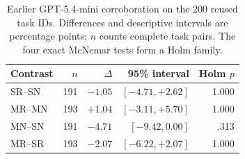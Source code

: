 \begin{table}[t]
\caption{Earlier GPT-5.4-mini corroboration on the 200 reused task IDs. Differences and descriptive intervals are percentage points; $n$ counts complete task pairs. The four exact McNemar tests form a Holm family.}
\label{tab:mini-validation}
\centering\small
\begin{tabular}{@{}lrrrr@{}}
\toprule
Contrast & $n$ & $\Delta$ & 95\% interval & Holm $p$\\
\midrule
SR--SN & 191 & $-1.05$ & $[-4.71,+2.62]$ & 1.000\\
MR--MN & 193 & $+1.04$ & $[-3.11,+5.70]$ & 1.000\\
MN--SN & 191 & $-4.71$ & $[-9.42,0.00]$ & .313\\
MR--SR & 193 & $-2.07$ & $[-6.22,+2.07]$ & 1.000\\
\bottomrule
\end{tabular}
\end{table}

